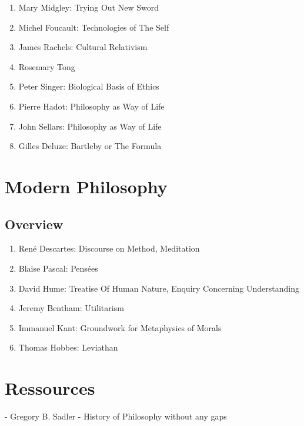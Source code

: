 \documentclass{article}
\begin{document}
\begin{enumerate}
    \item Mary Midgley: Trying Out New Sword
    \item Michel Foucault: Technologies of The Self
    \item James Rachels: Cultural Relativism
    \item Rosemary Tong
    \item Peter Singer: Biological Basis of Ethics
    \item Pierre Hadot: Philosophy as Way of Life
    \item John Sellars: Philosophy as Way of Life
    \item Gilles Deluze: Bartleby or The Formula
\end{enumerate}

\section{Modern Philosophy}

\subsection{Overview}%
\label{sub:Overview}

\begin{enumerate}
    \item René Descartes: Discourse on Method, Meditation
    \item Blaise Pascal: Pensées
    \item David Hume: Treatise Of Human Nature, Enquiry Concerning Understanding
    \item Jeremy Bentham: Utilitarism
    \item Immanuel Kant: Groundwork for Metaphysics of Morals
    \item Thomas Hobbes: Leviathan
\end{enumerate}


\section{Ressources}%
\label{sec:Ressources}

- Gregory B. Sadler
- History of Philosophy without any gaps
\end{document}
